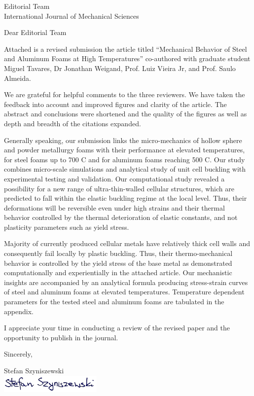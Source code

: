 \documentclass[11pt]{durhamLetter}
\newcommand{\JournalName}{International Journal of Mechanical Sciences}
\begin{document}
\begin{letter}{
		Editorial Team \\
		\JournalName
               }

\opening{Dear Editorial Team}

Attached is a revised submission the article titled “Mechanical Behavior of Steel and Aluminum Foams at High Temperatures” co-authored with graduate student Miguel Tavares, Dr Jonathan Weigand, Prof. Luiz Vieira Jr, and Prof. Saulo Almeida.

We are grateful for helpful comments to the three reviewers. We have taken the feedback into account and improved figures and clarity of the article. The abstract and conclusions were shortened and the quality of the figures as well as depth and breadth of the citations expanded.

Generally speaking, our submission links the micro-mechanics of hollow sphere and powder metallurgy foams with their performance at elevated temperatures, for steel foams up to 700 C and for aluminum foams reaching 500 C. Our study combines micro-scale simulations and analytical study of unit cell buckling with experimental testing and validation. Our computational study revealed a possibility for a new range of ultra-thin-walled cellular structures, which are predicted to fall within the elastic buckling regime at the local level. Thus, their deformations will be reversible even under high strains and their thermal behavior controlled by the thermal deterioration of elastic constants, and not plasticity parameters such as yield stress. 

Majority of currently produced cellular metals have relatively thick cell walls and consequently fail locally by plastic buckling. Thus, their thermo-mechanical behavior is controlled by the yield stress of the base metal as demonstrated computationally and experientially in the attached article. Our mechanistic insights are accompanied by an analytical formula producing stress-strain curves of steel and aluminum foams at elevated temperatures. Temperature dependent parameters for the tested steel and aluminum foams are tabulated in the appendix.

I appreciate your time in conducting a review of the revised paper and the opportunity to publish in the journal.

Sincerely,

\vspace{1\parskip}%

\closing{ Stefan Szyniszewski \\
	\includegraphics[width=0.8\linewidth]{Signature.png}
}




\end{letter}
\end{document}
